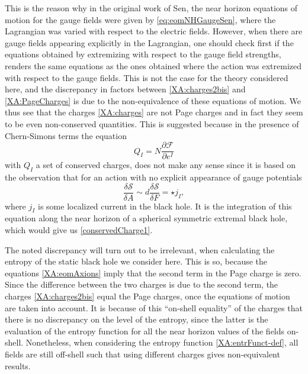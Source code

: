 \documentclass[12pt,twoside]{book}
\begin{document}
This is the reason why in the original work of Sen, the near horizon equations of motion for the gauge fields were given by \eqref{eq:eomNHGaugeSen}, where the Lagrangian was varied with respect to the electric fields. However, when there are gauge fields appearing explicitly in the Lagrangian, one should check first if the equations obtained by extremizing with respect to the gauge field strengths, renders the same equations as the ones obtained where the action was extremized with respect to the gauge fields. This is not the case for the theory considered here, and the discrepancy in factors between \eqref{XA:charges2bis} and \eqref{XA:PageCharges} is due to the non-equivalence of these equations of motion. 
We thus see that the charges \eqref{XA:charges} are not Page charges and in fact they seem to be even non-conserved quantities. This is suggested because in the presence of Chern-Simons terms the equation
\begin{equation}\label{conservedCharge1}
Q_{I} = N \frac{\partial \mathcal{F}}{\partial e^{I}}
\end{equation}
with $Q_{I}$ a set of conserved charges, does not make any sense since it is based on the observation that for an action with no explicit appearance of gauge potentials
\begin{equation}
\frac{\delta \mathcal{S}}{\delta A} \sim d \frac{\delta \mathcal{S}}{\delta F} = \star j_{I},
\end{equation}
where $j_{I}$ is some localized current in the black hole. It is the integration of this equation along the near horizon of a spherical symmetric extremal black hole, which would give us \eqref{conservedCharge1}.

The noted discrepancy will turn out to be irrelevant, when calculating the entropy of the static black hole we consider here. This is so, because the equations \eqref{XA:eomAxions} imply that the second term in the Page charge is zero. Since the difference between the two charges is due to the second term, the charges \eqref{XA:charges2bis} equal the Page charges, once the equations of motion are taken into account. It is because of this ``on-shell equality'' of the charges that there is no discrepancy on the level of the entropy, since the latter is the evaluation of the entropy function for all the near horizon values of the fields on-shell. Nonetheless, when considering the entropy function \eqref{XA:entrFunct-def}, all fields are still off-shell such that using different charges gives non-equivalent results.
\end{document}
